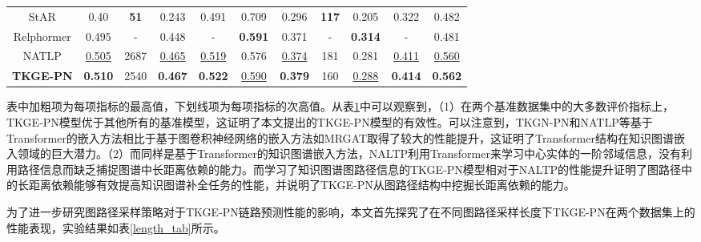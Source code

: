 \begin{table}[htbp]
\begin{center}
\begin{tabular}{*{11}{c}}
            StAR&0.40&\textbf{51}&0.243	&0.491	&0.709	&0.296	&\textbf{117}&	0.205	&0.322	&0.482\\
            Relphormer&0.495&-&0.448&	-	&\textbf{0.591}&	0.371		&-&\textbf{0.314}	&-	&0.481\\
            \cmidrule{1-11}
            NATLP&\underline{0.505}&2687&\underline{0.465}&\underline{0.519}&0.576&\underline{0.374}&181&0.281&\underline{0.411}&\underline{0.560}\\
            \textbf{TKGE-PN}&\textbf{0.510}&2540&\textbf{0.467}	&\textbf{0.522}	&\underline{0.590}	&\textbf{0.379}	&160	&\underline{0.288}	&\textbf{0.414}	&\textbf{0.562}\\
            \bottomrule
        \end{tabular}
        \label{TKGE-PN_result_tab}
    \end{center}
  \end{table}

表中加粗项为每项指标的最高值，下划线项为每项指标的次高值。从表\ref{TKGE-PN_result_tab}中可以观察到，（1）在两个基准数据集中的大多数评价指标上，TKGE-PN模型优于其他所有的基准模型，这证明了本文提出的TKGE-PN模型的有效性。可以注意到，TKGN-PN和NATLP等基于Transformer的嵌入方法相比于基于图卷积神经网络的嵌入方法如MRGAT取得了较大的性能提升，这证明了Transformer结构在知识图谱嵌入领域的巨大潜力。（2）而同样是基于Transformer的知识图谱嵌入方法，NALTP利用Transformer来学习中心实体的一阶邻域信息，没有利用路径信息而缺乏捕捉图谱中长距离依赖的能力。而学习了知识图谱图路径信息的TKGE-PN模型相对于NALTP的性能提升证明了图路径中的长距离依赖能够有效提高知识图谱补全任务的性能，并说明了TKGE-PN从图路径结构中挖掘长距离依赖的能力。

为了进一步研究图路径采样策略对于TKGE-PN链路预测性能的影响，本文首先探究了在不同图路径采样长度下TKGE-PN在两个数据集上的性能表现，实验结果如表\ref{length_tab}所示。

